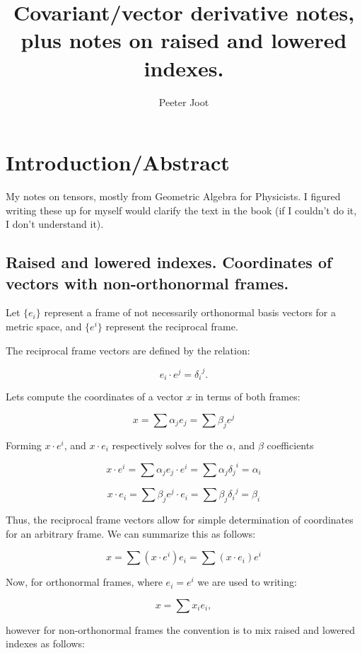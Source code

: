 \documentclass{article}      %
\title{ Covariant/vector derivative notes, plus notes on raised and lowered indexes.  }
\author{Peeter Joot}         %
\begin{document}

\maketitle{}

\section{Introduction/Abstract}

My notes on tensors, mostly from Geometric Algebra for Physicists.  I figured writing these up for myself would clarify the text in the book (if I couldn't do it, I don't understand it).

\subsection{ Raised and lowered indexes. Coordinates of vectors with non-orthonormal frames. }

Let $\{ e_i \}$ represent a frame of not necessarily orthonormal basis vectors for a metric space, and $\{ e^i \}$ represent the reciprocal frame.

The reciprocal frame vectors are defined by the relation:

\begin{equation}
e_i \cdot e^j = {\delta_i}^j.
\end{equation}

Lets compute the coordinates of a vector $x$ in terms of both frames:

\[
x = \sum \alpha_j e_j = \sum \beta_j e^j
\]

Forming $x \cdot e^i$, and $x \cdot e_i$ respectively solves for the $\alpha$, and $\beta$ coefficients

\[
x \cdot e^i = \sum \alpha_j e_j \cdot e^i = \sum \alpha_j {\delta_j}^i = \alpha_i
\]

\[
x \cdot e_i = \sum \beta_j e^j \cdot e_i = \sum \beta_j {\delta_i}^j = \beta_i
\]

Thus, the reciprocal frame vectors allow for simple determination of coordinates for an arbitrary frame. We can summarize this as follows:

\[
x = \sum ( x \cdot e^i ) e_i = \sum ( x \cdot e_i ) e^i
\]

Now, for orthonormal frames, where $e_i = e^i$ we are used to writing:

\[
x = \sum x_i e_i,
\]

however for non-orthonormal frames the convention is to mix raised and lowered indexes as follows:
\end{document}
